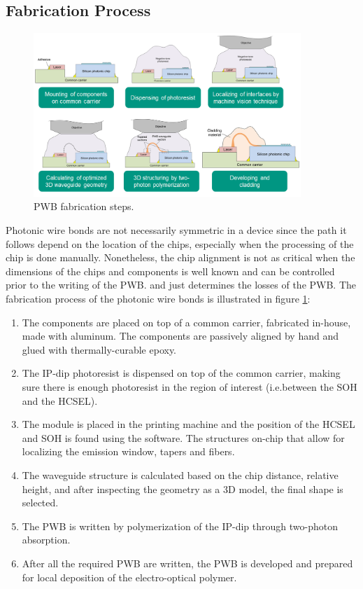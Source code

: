 \subsection{Fabrication Process}
\label{ch:th:fabPWB}

\begin{figure}[!ht]
\centering
  \includegraphics[width=0.9\textwidth]{figs/pkgprocess}
  \caption{PWB fabrication steps.}
  \label{fig:SOHpkg}
\end{figure}

Photonic wire bonds are not necessarily symmetric in a device since the path it follows depend on the location of the chips, especially when the processing of the chip is done manually. Nonetheless, the chip alignment is not as critical when the dimensions of the chips and components is well known and can be controlled prior to the writing of the PWB. and just determines the losses of the PWB. The fabrication process of the photonic wire bonds is illustrated in figure \ref{fig:SOHpkg}:

\begin{enumerate}
\item The components are placed on top of a common carrier, fabricated in-house, made with aluminum. The components are passively aligned by hand and glued with thermally-curable epoxy. 
\item The IP-dip photoresist is dispensed on top of the common carrier, making sure there is enough photoresist in the region of interest (i.e.between the SOH and the HCSEL).
\item The module is placed in the printing machine and the position of the HCSEL and SOH is found using the software. The structures on-chip that allow for localizing the emission window, tapers and fibers.
\item The waveguide structure is calculated based on the chip distance, relative height, and after inspecting the geometry as a 3D model, the final shape is selected.
\item The PWB is written by polymerization of the IP-dip through two-photon absorption. 
\item After all the required PWB are written, the PWB is developed and prepared for local deposition of the electro-optical polymer.
\end{enumerate}

